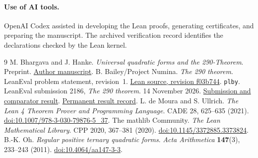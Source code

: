 \documentclass[11pt,a4paper]{article}
\newcommand{\code}[1]{\texttt{#1}}
\begin{document}
\paragraph{Use of AI tools.}
OpenAI Codex assisted in developing the Lean proofs, generating
certificates, and preparing the manuscript. The archived verification
record identifies the declarations checked by the Lean kernel.

\begin{thebibliography}{9}
 M. Bhargava and J. Hanke.
\emph{Universal quadratic forms and the 290-Theorem}. Preprint.
\href{https://math.stanford.edu/~vakil/files/290-Theorem-preprint.pdf}{Author manuscript}.
 B. Bailey/Project Numina.
\emph{The 290 theorem}. LeanEval problem statement, revision~1.
\href{https://github.com/leanprover/lean-eval/blob/f03b744959aac50ab1dd8ee2d4dd4397df5d4e6f/LeanEval/NumberTheory/TwoNinetyTheorem.lean}{Lean source, revision f03b744}.
 \code{plby}. LeanEval submission 2186, \emph{The 290 theorem}.
14 November 2026.
\href{https://github.com/leanprover/lean-eval-submissions/issues/2186}{Submission and comparator result}.
\href{https://github.com/leanprover/lean-eval-submissions/commit/48c742b7c39ecb339fe37ec91b7f8ad81fc9e645}{Permanent result record}.
 L. de Moura and S. Ullrich.
\emph{The Lean 4 Theorem Prover and Programming Language}.
CADE 28, 625--635 (2021).
\href{https://doi.org/10.1007/978-3-030-79876-5_37}{doi:10.1007/978-3-030-79876-5\_37}.
 The mathlib Community.
\emph{The Lean Mathematical Library}.
CPP 2020, 367--381 (2020).
\href{https://doi.org/10.1145/3372885.3373824}{doi:10.1145/3372885.3373824}.
 B.-K. Oh.
\emph{Regular positive ternary quadratic forms}.
\emph{Acta Arithmetica} \textbf{147}(3), 233--243 (2011).
\href{https://doi.org/10.4064/aa147-3-3}{doi:10.4064/aa147-3-3}.
\end{thebibliography}
\end{document}
